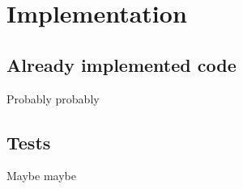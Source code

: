 
\chapter{Implementation}
\label{ch:implementation}

\section{Already implemented code}

Probably probably

\section{Tests}

Maybe maybe